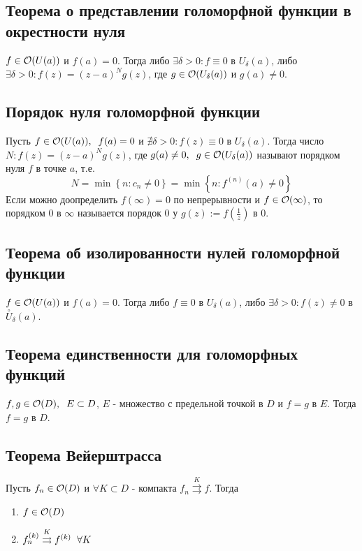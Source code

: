 \subsection{Теорема о представлении голоморфной функции в окрестности нуля}
\begin{theorem}
  $f\in\mathcal{O}(U(a))$ и $f(a)=0$. Тогда либо $\exists \delta>0\colon f\equiv 0$ в $U_\delta(a)$, либо $\exists \delta>0\colon f(z)=(z-a)^Ng(z)$, где $g\in\mathcal{O}(U_\delta(a))$ и $g(a)\neq0$. 
\end{theorem}
\subsection{Порядок нуля голоморфной функции}
\begin{definition}
  Пусть $f\in\mathcal{O}(U(a)),\hspace{0.2cm} f(a)=0$ и $\nexists\delta>0\colon f(z)\equiv 0$ в $U_\delta(a)$. Тогда число $N\colon f(z)=(z-a)^Ng(z)$, где $g(a)\neq 0,\hspace{0.2cm} g\in\mathcal{O}(U_\delta(a))$ называют порядком нуля $f$ в точке $a$, т.е.
  \[N=\min \left\{n\colon c_n\neq 0\right\} = \min \left\{n\colon f^{(n)}(a)\neq 0\right\}\]
  Если можно доопределить $f(\infty)=0$ по непрерывности и $f\in\mathcal{O}(\infty)$, то порядком 0 в $\infty$ называется порядок 0 у $g(z):=f(\frac{1}{z})$ в 0. 
\end{definition}
\subsection{Теорема об изолированности нулей голоморфной функции}
\begin{theorem}
  $f\in\mathcal{O}(U(a))$ и $f(a)=0$. Тогда либо $f\equiv 0$ в $U_\delta(a)$, либо $\exists\delta>0\colon f(z)\neq 0$ в $\overset{\circ}{U}_\delta(a)$. 
\end{theorem}
\subsection{Теорема единственности для голоморфных функций}
\begin{theorem}
  $f,g\in\mathcal{O}(D),\hspace{0.2cm} E\subset D$, $E$ - множество с предельной точкой в $D$ и $f = g$ в $E$. Тогда $f=g$ в $D$. 
\end{theorem} 
\subsection{Теорема Вейерштрасса}
\begin{theorem}
  Пусть $f_n\in\mathcal{O}(D)$ и $\forall K\subset D$ - компакта $f_n\overset{K}{\rightrightarrows}f$. Тогда
  \begin{enumerate}
    \item $f\in \mathcal{O}(D)$
    \item $f_n^{(k)}\overset{K}{\rightrightarrows}f^{(k)}\hspace{0.2cm}\forall K$ 
  \end{enumerate}
\end{theorem}
